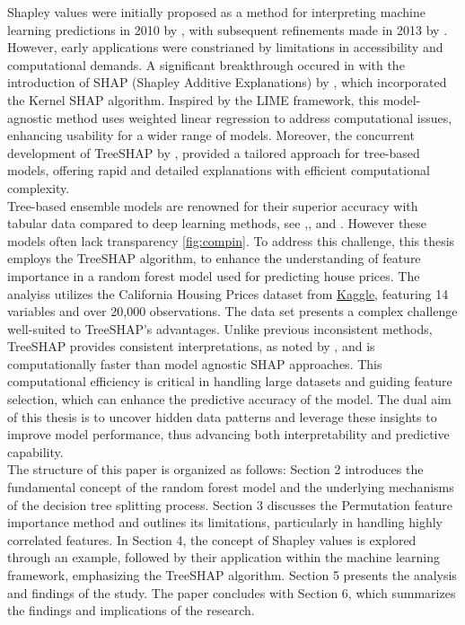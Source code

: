 \documentclass[12pt]{article}
\begin{document}
Shapley values were initially proposed as a method for interpreting machine learning predictions in 2010 by \citet{article2}, with subsequent refinements made in 2013 by \citet{article3}.
However, early applications were constrianed by limitations in accessibility and computational demands.
A significant breakthrough occured in with the introduction of SHAP (Shapley Additive Explanations) by \citet{10.5555/3295222.3295230}, which incorporated the Kernel SHAP algorithm.
Inspired by the LIME framework, this model-agnostic method uses weighted linear regression to address computational issues, enhancing usability for a wider range of models.
Moreover, the concurrent development of TreeSHAP by \citet{unknown}, provided a tailored approach for tree-based models, offering rapid and detailed explanations with efficient computational complexity. \\
Tree-based ensemble models are renowned for their superior accuracy with tabular data compared to deep learning methods, see \citet{Chen_2016},\citet{grinsztajn2022treebased}, and \citet{lundberg2019explainable}.
However these models often lack transparency \ref{fig:compin}.
To address this challenge, this thesis employs the TreeSHAP algorithm, to enhance the understanding of feature importance in a random forest model used for predicting house prices.
The analyiss utilizes the California Housing Prices dataset from \href{https://www.kaggle.com/datasets/camnugent/california-housing-prices}{Kaggle}, featuring 14 variables and over 20,000 observations. The data set presents a complex challenge well-suited to TreeSHAP's advantages.
Unlike previous inconsistent methods, TreeSHAP provides consistent interpretations, as noted by \citet{lundberg2019consistent}, and is computationally faster than model agnostic SHAP approaches.
This computational efficiency is critical in handling large datasets and guiding feature selection, which can enhance the predictive accuracy of the model.
The dual aim of this thesis is to uncover hidden data patterns and leverage these insights to improve model performance, thus advancing both interpretability and predictive capability.\\
The structure of this paper is organized as follows: Section 2 introduces the fundamental concept of the random forest model and the underlying mechanisms of the decision tree splitting process. Section 3 discusses the Permutation feature importance method and outlines its limitations, particularly in handling highly correlated features. In Section 4, the concept of Shapley values is explored through an example, followed by their application within the machine learning framework, emphasizing the TreeSHAP algorithm. Section 5 presents the analysis and findings of the study. The paper concludes with Section 6, which summarizes the findings and implications of the research.
\end{document}
